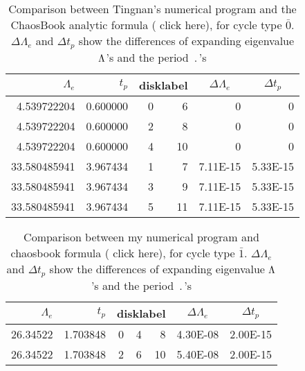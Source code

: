 \begin{table}[htbp]
  \centering
  \caption{Comparison between Tingnan's numerical program and
  the ChaosBook analytic formula
  (
  {click here}), for cycle type $\bar{0}$. $\Delta\Lambda_e$ and $\Delta t_p$ show the differences of expanding eigenvalue $\Lambda$'s and  the period $\period{}$'s}
    \begin{tabular}{|r|r|rr|r|r|}
	\hline
    $\Lambda_e$ & $t_p$    & \multicolumn{2}{c|}{disklabel} &\multicolumn{1}{c|}{ $\Delta\Lambda_e$} & \multicolumn{1}{c|}{$\Delta t_p$} \\\hline
    4.539722204 & 0.600000 & 0     & 6     &  0     & 0 \\
    4.539722204 & 0.600000 & 2     & 8     &  0     & 0 \\
    4.539722204 & 0.600000 & 4     & 10    &  0     & 0 \\
    33.580485941 & 3.967434 & 1     & 7     &  7.11E-15 & 5.33E-15 \\
    33.580485941 & 3.967434 & 3     & 9     &  7.11E-15 & 5.33E-15 \\
    33.580485941 & 3.967434 & 5     & 11    &  7.11E-15 & 5.33E-15 \\
    \hline
    \end{tabular}%
  \label{tab:comparison0}%
\end{table}%
\begin{table}[htbp]
  \centering
  \caption{Comparison between my numerical program and chaosbook formula  (
    {click here}), for cycle type $\bar{1}$. $\Delta\Lambda_e$ and $\Delta t_p$ show the differences of expanding eigenvalue $\Lambda$'s and  the period $\period{}$'s}
    \begin{tabular}{|r|r|rrr|r|r|}
    \hline
        $\Lambda_e$ & $t_p$    & \multicolumn{3}{c|}{disklabel} &\multicolumn{1}{c|}{ $\Delta\Lambda_e$} & \multicolumn{1}{c|}{$\Delta t_p$} \\\hline
    26.34522 & 1.703848 & 0     & 4     & 8     & 4.30E-08 & 2.00E-15 \\
    26.34522 & 1.703848 & 2     & 6     & 10    & 5.40E-08 & 2.00E-15 \\
	\hline
    \end{tabular}%
  \label{tab:comparison1}%
\end{table}%
